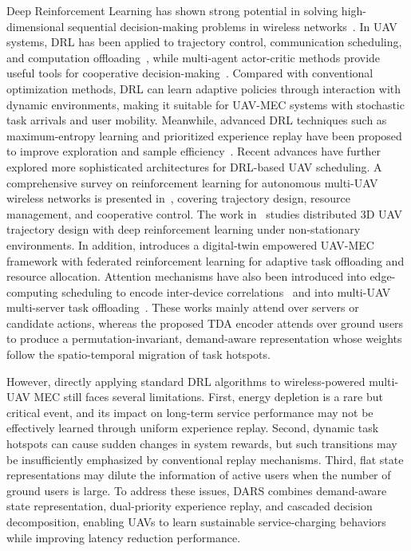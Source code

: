 \documentclass[journal]{IEEEtran}
\begin{document}
Deep Reinforcement Learning has shown strong potential 
in solving high-dimensional sequential decision-making problems 
in wireless networks~\cite{luong2019applications}. In UAV 
systems, DRL has been applied to trajectory control, 
communication scheduling, and computation 
offloading~\cite{jie2020drl, zhang2018stochastic}, while 
multi-agent actor-critic methods provide useful tools for 
cooperative decision-making~\cite{lowe2017multi}. Compared with 
conventional optimization methods, DRL can learn adaptive 
policies through interaction with dynamic environments, making 
it suitable for UAV-MEC systems with stochastic task arrivals 
and user mobility. Meanwhile, advanced DRL techniques such as 
maximum-entropy learning and prioritized experience replay have 
been proposed to improve exploration and sample 
efficiency~\cite{haarnoja2018soft, schaul2016per}. 
Recent advances have further explored more sophisticated 
architectures for DRL-based UAV scheduling. 
A comprehensive survey on reinforcement learning for autonomous 
multi-UAV wireless networks is presented 
in~\cite{bai2023towards}, covering trajectory design, resource 
management, and cooperative control. 
The work in~\cite{he2024deep} studies distributed 3D UAV 
trajectory design with deep reinforcement learning under 
non-stationary environments. 
In addition, \cite{consul2024hybrid} introduces a digital-twin 
empowered UAV-MEC framework with federated reinforcement 
learning for adaptive task offloading and resource allocation.
Attention mechanisms have also been introduced into edge-computing scheduling
to encode inter-device correlations~\cite{li2023task,wang2024tfddrl} and into
multi-UAV multi-server task offloading~\cite{chen2024attention_offloading}.
These works mainly attend over servers or candidate actions, whereas the
proposed TDA encoder attends over ground users to produce a
permutation-invariant, demand-aware representation whose weights follow the
spatio-temporal migration of task hotspots.


However, directly applying standard DRL algorithms to 
wireless-powered multi-UAV MEC still faces several limitations. 
First, energy depletion is a rare but critical event, and its 
impact on long-term service performance may not be effectively 
learned through uniform experience replay. Second, dynamic task 
hotspots can cause sudden changes in system rewards, but such 
transitions may be insufficiently emphasized by conventional 
replay mechanisms. Third, flat state representations may dilute 
the information of active users when the number of ground users 
is large. To address these issues, DARS combines demand-aware 
state representation, dual-priority experience replay, and 
cascaded decision decomposition, enabling UAVs to learn 
sustainable service-charging behaviors while improving latency 
reduction performance.
\end{document}

